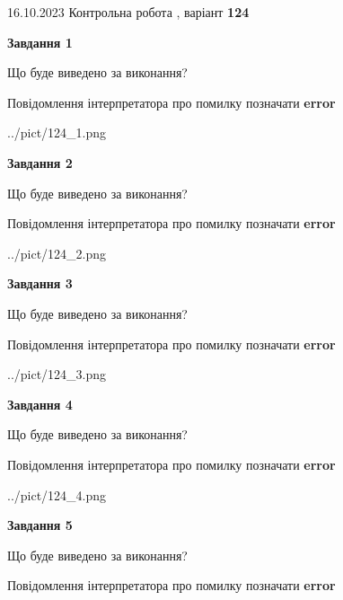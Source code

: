 \documentclass[12pt, ukrainian]{article}
\begin{document}
{\Large{16.10.2023 Контрольна робота , варіант  \No \textbf { 124 }\par}}
{
\begin {large}
{\begin {center}\textbf{Завдання 1}\end {center}}\par
Що буде виведено за виконання? \par
Повідомлення інтерпретатора про помилку позначати \textbf{error}

\begin{center}
	{../pict/124_1.png}
\end{center}
\newpage

{\begin {center}\textbf{Завдання 2}\end {center}}\par
Що буде виведено за виконання? \par
Повідомлення інтерпретатора про помилку позначати \textbf{error}

\begin{center}
	{../pict/124_2.png}
\end{center}
\newpage

{\begin {center}\textbf{Завдання 3}\end {center}}\par
Що буде виведено за виконання? \par
Повідомлення інтерпретатора про помилку позначати \textbf{error}

\begin{center}
	{../pict/124_3.png}
\end{center}
\newpage

{\begin {center}\textbf{Завдання 4}\end {center}}\par
Що буде виведено за виконання? \par
Повідомлення інтерпретатора про помилку позначати \textbf{error}

\begin{center}
	{../pict/124_4.png}
\end{center}
\newpage

{\begin {center}\textbf{Завдання 5}\end {center}}\par
Що буде виведено за виконання? \par
Повідомлення інтерпретатора про помилку позначати \textbf{error}


\end{large}}
\end{document}
